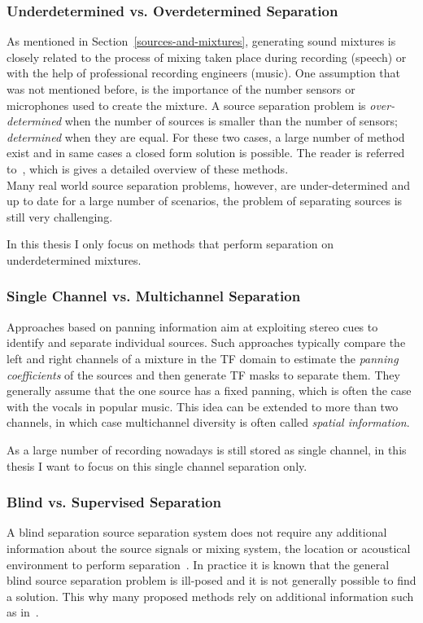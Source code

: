 \subsubsection*{Underdetermined vs. Overdetermined Separation}
As mentioned in Section~\ref{sources-and-mixtures}, generating sound mixtures is closely related to the process of mixing taken place during recording (speech) or with the help of professional recording engineers (music).
One assumption that was not mentioned before, is the importance of the number sensors or microphones used to create the mixture.
A source separation problem is \emph{over-determined} when the number of sources is smaller than the number of sensors; \emph{determined} when they are equal.
For these two cases, a large number of method exist and in same cases a closed form solution is possible.
The reader is referred to~\cite{common10}, which is gives a detailed overview of these methods.\\
Many real world source separation problems, however, are under-determined and up to date for a large number of scenarios, the problem of separating sources is still very challenging.
\par
In this thesis I only focus on methods that perform separation on underdetermined mixtures.

\subsubsection*{Single Channel vs. Multichannel Separation}
Approaches based on panning information aim at exploiting stereo cues to identify and separate individual sources. Such approaches typically compare the left and right channels of a mixture in the TF domain to estimate the \textit{panning coefficients} of the sources and then generate TF masks to separate them. They generally assume that the one source has a fixed panning, which is often the case with the vocals in popular music. This idea can be extended to more than two channels, in which case multichannel diversity is often called \textit{spatial information}.
\par
As a large number of recording nowadays is still stored as single channel, in this thesis I want to focus on this single channel separation only.

\subsubsection*{Blind vs. Supervised Separation}
A blind separation source separation system does not require any additional information about the source signals or mixing system, the location or acoustical environment to perform separation~\cite{makino07}.
In practice it is known that the general blind source separation problem is ill-posed and it is not generally possible to find a solution.
This why many proposed methods rely on additional information such as in~\cite{liutkus13, ewert14}.

